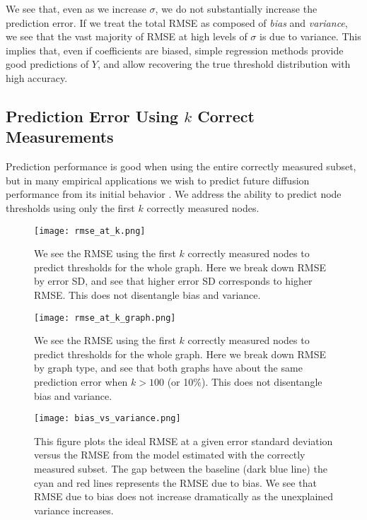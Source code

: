 \documentclass[a4paper]{article}
\begin{document}
We see that, even as we increase $\sigma$, we do not substantially increase the prediction error. If we treat the total RMSE as composed of \emph{bias} and \emph{variance}, we see that the vast majority of RMSE at high levels of $\sigma$ is due to variance. This implies that, even if coefficients are biased, simple regression methods provide good predictions of $Y$, and allow recovering the true threshold distribution with high accuracy.

\subsection{Prediction Error Using $k$ Correct Measurements}

Prediction performance is good when using the entire correctly measured subset, but in many empirical applications we wish to predict future diffusion performance from its initial behavior \parencite{Cheng2014a}. We address the ability to predict node thresholds using only the first $k$ correctly measured nodes.

\begin{figure}[h]
\label{fig:rmse_at_k_sd}
\texttt{[image: rmse\_at\_k.png]}
\caption{We see the RMSE using the first $k$ correctly measured nodes to predict thresholds for the whole graph. Here we break down RMSE by error SD, and see that higher error SD corresponds to higher RMSE. This does not disentangle bias and variance.}
\end{figure}

\begin{figure}[h]
\label{fig:rmse_at_k_graph}
\texttt{[image: rmse\_at\_k\_graph.png]}
\caption{We see the RMSE using the first $k$ correctly measured nodes to predict thresholds for the whole graph. Here we break down RMSE by graph type, and see that both graphs have about the same prediction error when $k > 100$ (or 10\%). This does not disentangle bias and variance.}
\end{figure}

\begin{figure}[h]
\label{fig:bias_vs_variance}
\texttt{[image: bias\_vs\_variance.png]}
\caption{This figure plots the ideal RMSE at a given error standard deviation versus the RMSE from the model estimated with the correctly measured subset. The gap between the baseline (dark blue line) the cyan and red lines represents the RMSE due to bias. We see that RMSE due to bias does not increase dramatically as the unexplained variance increases.}
\end{figure}
\end{document}
